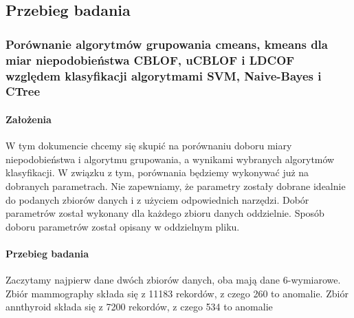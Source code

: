 \documentclass[
]{article}
\begin{document}
\hypertarget{przebieg-badania}{%
\subsection{Przebieg badania}\label{przebieg-badania}}

\hypertarget{poruxf3wnanie-algorytmuxf3w-grupowania-cmeans-kmeans-dla-miar-niepodobieux144stwa-cblof-ucblof-i-ldcof-wzglux119dem-klasyfikacji-algorytmami-svm-naive-bayes-i-ctree}{%
\subsubsection{Porównanie algorytmów grupowania cmeans, kmeans dla miar
niepodobieństwa CBLOF, uCBLOF i LDCOF względem klasyfikacji algorytmami
SVM, Naive-Bayes i
CTree}\label{poruxf3wnanie-algorytmuxf3w-grupowania-cmeans-kmeans-dla-miar-niepodobieux144stwa-cblof-ucblof-i-ldcof-wzglux119dem-klasyfikacji-algorytmami-svm-naive-bayes-i-ctree}}

\hypertarget{zaux142oux17cenia}{%
\paragraph{Założenia}\label{zaux142oux17cenia}}

W tym dokumencie chcemy się skupić na porównaniu doboru miary
niepodobieństwa i algorytmu grupowania, a wynikami wybranych algorytmów
klasyfikacji. W związku z tym, porównania będziemy wykonywać już na
dobranych parametrach. Nie zapewniamy, że parametry zostały dobrane
idealnie do podanych zbiorów danych i z użyciem odpowiednich narzędzi.
Dobór parametrów został wykonany dla każdego zbioru danych oddzielnie.
Sposób doboru parametrów został opisany w oddzielnym pliku.

\hypertarget{przebieg-badania-1}{%
\paragraph{Przebieg badania}\label{przebieg-badania-1}}

Zaczytamy najpierw dane dwóch zbiorów danych, oba mają dane 6-wymiarowe.
Zbiór mammography składa się z 11183 rekordów, z czego 260 to anomalie.
Zbiór annthyroid składa się z 7200 rekordów, z czego 534 to anomalie
\end{document}
